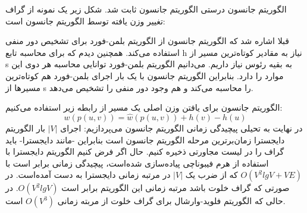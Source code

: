 \begin{itemframe}{الگوریتم جانسون}
\itm
درستی الگوریتم جانسون ثابت شد. شکل زیر یک نمونه از گراف تغییر وزن یافته توسط الگوریتم جانسون است:

\itm
قبلا اشاره شد که الگوریتم جانسون از الگوریتم بلمن-فورد برای تشخیص دور منفی استفاده می‌کند. همچنین دیدم که برای محاسبه تابع h نیاز به مقادیر کوتاه‌ترین مسیر از s به بقیه رئوس نیاز داریم. می‌دانیم الگوریتم بلمن-فورد توانایی محاسبه هر دوی این موارد را دارد. بنابراین الگوریتم جانسون با یک بار اجرای بلمن-فورد هم کوتاه‌ترین مسیرها از s را محاسبه می‌کند و هم وجود دور منفی را تشخیص می‌دهد.
\end{itemframe}


\begin{itemframe}{الگوریتم جانسون}
\itm
برای یافتن وزن اصلی یک مسیر از رابطه زیر استفاده می‌کنیم:
$$
w(p(u, v)) = \hat{w}(p(u, v)) + h(v) - h(u)
$$
\itm
در نهایت به تحیلی پیچیدگی زمانی الگوریتم جانسون می‌پردازیم:
\itm
اجرای $|V|$ بار الگوریتم دایجسترا زمان‌برترین مرحله الگوریتم جانسون است بنابراین -مانند دایجسترا- باید گراف را در لیست مجاورتی ذخیره کنیم. حال اگر فرض کنیم الگوریتم دایجسترا با استفاده از هرم فیبوناچی پیاده‌سازی شده‌است، پیچیدگی زمانی برابر است با
$O(V^2lgV+VE)$
که از ضرب یک
$|V|$
در مرتبه زمانی دایجسترا به دست آمده‌است.
\itm
در صورتی که گراف خلوت باشد مرتبه زمانی این الگوریتم برابر است
$O(V^2lgV)$.
در حالی که الگوریتم فلوید-وارشال برای گراف خلوت از مربته زمانی
$O(V^3)$
است.
\end{itemframe}